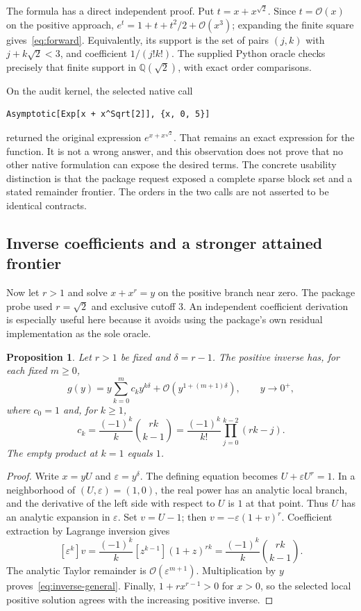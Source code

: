 \documentclass[11pt]{article}
\newcommand{\q}{\sqrt{2}}
\newcommand{\Oh}{\mathcal O}
\newtheorem{proposition}{Proposition}
\begin{document}
The formula has a direct independent proof. Put $t=x+x^{\q}$. Since $t=\Oh(x)$ on the positive approach,
$e^t=1+t+t^2/2+\Oh(x^3)$; expanding the finite square gives~\eqref{eq:forward}. Equivalently, its support is the set of pairs $(j,k)$ with $j+k\q<3$, and coefficient $1/(j!k!)$. The supplied Python oracle checks precisely that finite support in $\mathbb Q(\q)$, with exact order comparisons.

On the audit kernel, the selected native call
\begin{lstlisting}
Asymptotic[Exp[x + x^Sqrt[2]], {x, 0, 5}]
\end{lstlisting}
returned the original expression $e^{x+x^{\q}}$. That remains an exact expression for the function. It is not a wrong answer, and this observation does not prove that no other native formulation can expose the desired terms. The concrete usability distinction is that the package request exposed a complete sparse block set and a stated remainder frontier. The orders in the two calls are not asserted to be identical contracts.

\subsection{Inverse coefficients and a stronger attained frontier}
Now let $r>1$ and solve $x+x^r=y$ on the positive branch near zero. The package probe used $r=\q$ and exclusive cutoff $3$. An independent coefficient derivation is especially useful here because it avoids using the package's own residual implementation as the sole oracle.

\begin{proposition}
Let $r>1$ be fixed and $\delta=r-1$. The positive inverse has, for each fixed $m\geq0$,
\begin{equation}
 g(y)=y\sum_{k=0}^{m}c_k y^{k\delta}
       +\Oh\!\left(y^{1+(m+1)\delta}\right),\qquad y\to0^+,
 \label{eq:inverse-general}
\end{equation}
where $c_0=1$ and, for $k\geq1$,
\begin{equation}
 c_k=\frac{(-1)^k}{k}\binom{rk}{k-1}
    =\frac{(-1)^k}{k!}\prod_{j=0}^{k-2}(rk-j).
 \label{eq:ck}
\end{equation}
The empty product at $k=1$ equals $1$.
\end{proposition}
\begin{proof}
Write $x=yU$ and $\varepsilon=y^\delta$. The defining equation becomes
$U+\varepsilon U^r=1$. In a neighborhood of $(U,\varepsilon)=(1,0)$, the real power has an analytic local branch, and the derivative of the left side with respect to $U$ is $1$ at that point. Thus $U$ has an analytic expansion in $\varepsilon$. Set $v=U-1$; then $v=-\varepsilon(1+v)^r$. Coefficient extraction by Lagrange inversion gives
\[
 [\varepsilon^k]v=\frac{(-1)^k}{k}
       [z^{k-1}](1+z)^{rk}
       =\frac{(-1)^k}{k}\binom{rk}{k-1}.
\]
The analytic Taylor remainder is $\Oh(\varepsilon^{m+1})$. Multiplication by $y$ proves~\eqref{eq:inverse-general}. Finally, $1+r x^{r-1}>0$ for $x>0$, so the selected local positive solution agrees with the increasing positive inverse.
\end{proof}
\end{document}
